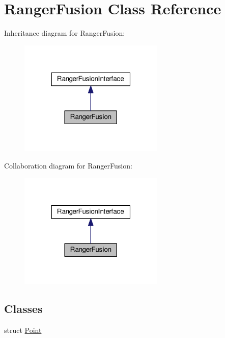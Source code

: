 \hypertarget{classRangerFusion}{}\section{Ranger\+Fusion Class Reference}
\label{classRangerFusion}


Inheritance diagram for Ranger\+Fusion\+:
\nopagebreak
\begin{figure}[H]
\begin{center}
\leavevmode
\includegraphics[width=196pt]{classRangerFusion__inherit__graph}
\end{center}
\end{figure}


Collaboration diagram for Ranger\+Fusion\+:
\nopagebreak
\begin{figure}[H]
\begin{center}
\leavevmode
\includegraphics[width=196pt]{classRangerFusion__coll__graph}
\end{center}
\end{figure}
\subsection*{Classes}
\begin{DoxyCompactItemize}
\item 
struct \hyperlink{structRangerFusion_1_1Point}{Point}
\end{DoxyCompactItemize}
